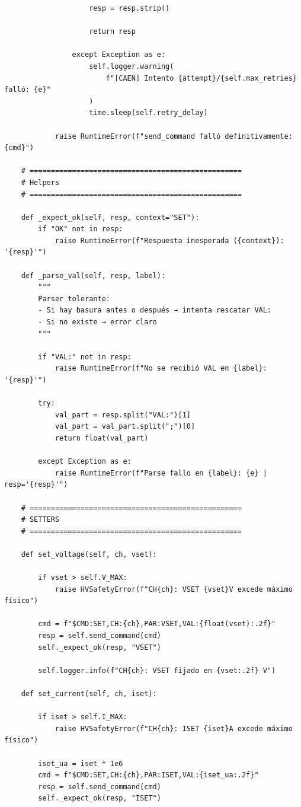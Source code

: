 \documentclass{article}
\begin{document}
\begin{lstlisting}
                    resp = resp.strip()

                    return resp

                except Exception as e:
                    self.logger.warning(
                        f"[CAEN] Intento {attempt}/{self.max_retries} falló: {e}"
                    )
                    time.sleep(self.retry_delay)

            raise RuntimeError(f"send_command falló definitivamente: {cmd}")

    # ==================================================
    # Helpers
    # ==================================================

    def _expect_ok(self, resp, context="SET"):
        if "OK" not in resp:
            raise RuntimeError(f"Respuesta inesperada ({context}): '{resp}'")

    def _parse_val(self, resp, label):
        """
        Parser tolerante:
        - Si hay basura antes o después → intenta rescatar VAL:
        - Si no existe → error claro
        """

        if "VAL:" not in resp:
            raise RuntimeError(f"No se recibió VAL en {label}: '{resp}'")

        try:
            val_part = resp.split("VAL:")[1]
            val_part = val_part.split(";")[0]
            return float(val_part)

        except Exception as e:
            raise RuntimeError(f"Parse fallo en {label}: {e} | resp='{resp}'")

    # ==================================================
    # SETTERS
    # ==================================================

    def set_voltage(self, ch, vset):

        if vset > self.V_MAX:
            raise HVSafetyError(f"CH{ch}: VSET {vset}V excede máximo físico")

        cmd = f"$CMD:SET,CH:{ch},PAR:VSET,VAL:{float(vset):.2f}"
        resp = self.send_command(cmd)
        self._expect_ok(resp, "VSET")

        self.logger.info(f"CH{ch}: VSET fijado en {vset:.2f} V")

    def set_current(self, ch, iset):

        if iset > self.I_MAX:
            raise HVSafetyError(f"CH{ch}: ISET {iset}A excede máximo físico")

        iset_ua = iset * 1e6
        cmd = f"$CMD:SET,CH:{ch},PAR:ISET,VAL:{iset_ua:.2f}"
        resp = self.send_command(cmd)
        self._expect_ok(resp, "ISET")


\end{lstlisting}
\end{document}
